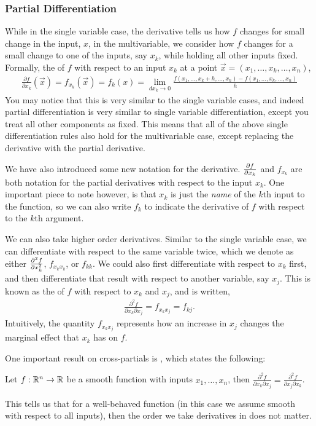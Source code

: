 \subsubsection*{Partial Differentiation}
While in the single variable case, the derivative tells us how $f$ changes for small change in the input, $x$, in the multivariable, we consider how $f$ changes for a small change to one of the inputs, say $x_k$, while holding all other inputs fixed. Formally, the  of $f$ with respect to an input $x_k$ at a point $\vec{x} = (x_1, \dots, x_k, \dots, x_n)$,
\begin{align*}
    \frac{\partial f}{\partial x_k}(\vec{x}) = f_{x_k}(\vec{x}) = f_k(x) = \lim_{dx_k \to 0} \frac{f(x_1, \dots, x_k + h, \dots, x_n) - f(x_1, \dots, x_k, \dots, x_n)}{h}
\end{align*}
You may notice that this is very similar to the single variable cases, and indeed partial differentiation is very similar to single variable differentiation, except you treat all other components as fixed. This means that all of the above single differentiation rules also hold for the multivariable case, except replacing the derivative with the partial derivative. 

We have also introduced some new notation for the derivative. $\frac{\partial f}{\partial x_k}$ and $f_{x_k}$ are both notation for the partial derivatives with respect to the input $x_k$. One important piece to note however, is that $x_k$ is just the \emph{name} of the $k$th input to the function, so we can also write $f_k$ to indicate the derivative of $f$ with respect to the $k$th argument. 

We can also take higher order derivatives. Similar to the single variable case, we can differentiate with respect to the same variable twice, which we denote as either $\frac{\partial ^2 f}{\partial x_k^2}$, $f_{x_k x_k}$, or $f_{kk}$. We could also first differentiate with respect to $x_k$ first, and then differentiate that result with respect to another variable, say $x_j$. This is known as the  of $f$ with respect to $x_k$ and $x_j$, and is written,
\begin{align*}
    \frac{\partial^2 f}{\partial x_k \partial x_j} = f_{x_k x_j} = f_{kj}.
\end{align*}
Intuitively, the quantity $f_{x_k x_j}$ represents how an increase in $x_j$ changes the marginal effect that $x_k$ has on $f$.

One important result on cross-partials is , which states the following:
\begin{theorem*}[Young] %
    Let $f: \mathbb{R}^n \to \mathbb{R}$ be a smooth function with inputs $x_1, \dots, x_n$, then $\frac{\partial^2 f}{\partial x_k \partial x_j} = \frac{\partial^2 f}{\partial x_j \partial x_k}$. 
\end{theorem*}
This tells us that for a well-behaved function (in this case we assume smooth with respect to all inputs), then the order we take derivatives in does not matter. 


